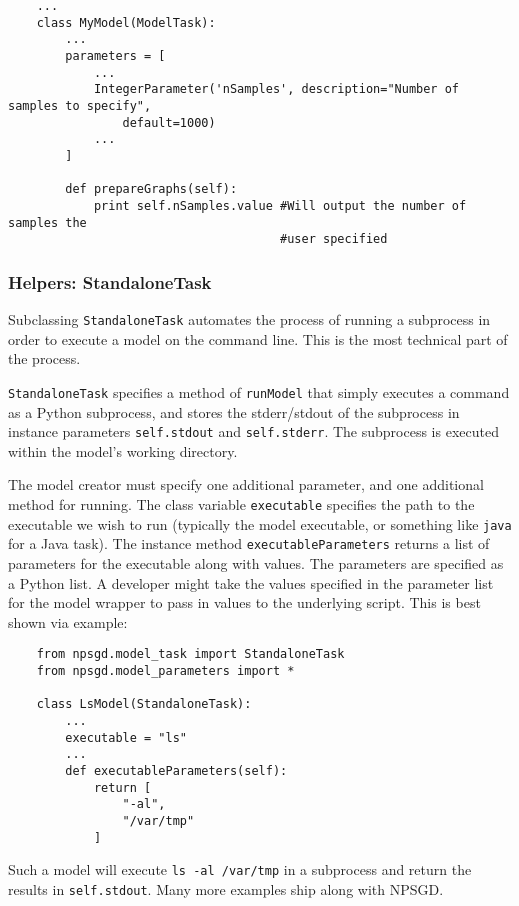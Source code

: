 \documentclass{article}
\newcommand{\mclass}[1]{\sloppy\texttt{#1}}
\begin{document}
\begin{lstlisting}
    ...
    class MyModel(ModelTask):
        ...
        parameters = [
            ...
            IntegerParameter('nSamples', description="Number of samples to specify",
                default=1000)
            ...
        ]

        def prepareGraphs(self):
            print self.nSamples.value #Will output the number of samples the
                                      #user specified

\end{lstlisting}

\subsubsection{Helpers: StandaloneTask}
Subclassing \mclass{StandaloneTask} automates the process of running a
subprocess in order to execute a model on the command line. This is the most
technical part of the process.

\mclass{StandaloneTask} specifies a method of \texttt{runModel} that simply
executes a command as a Python subprocess, and stores the stderr/stdout of the
subprocess in instance parameters \texttt{self.stdout} and \texttt{self.stderr}.
The subprocess is executed within the model's working directory. 

The model creator must specify one additional parameter, and one additional
method for running. The class variable \texttt{executable} specifies the path to
the executable we wish to run (typically the model executable, or something like
\texttt{java} for a Java task). The instance method \mclass{executableParameters} returns
a list of parameters for the executable along with values. The parameters are
specified as a Python list. A developer might take the values specified in the
parameter list for the model wrapper to pass in values to the underlying script. This is best shown via example:

\begin{lstlisting}
    from npsgd.model_task import StandaloneTask
    from npsgd.model_parameters import *

    class LsModel(StandaloneTask):
        ...
        executable = "ls"
        ...
        def executableParameters(self):
            return [
                "-al",
                "/var/tmp"
            ]
\end{lstlisting}

Such a model will execute \texttt{ls -al /var/tmp} in a subprocess and return the results in
\texttt{self.stdout}. Many more examples ship along with NPSGD.
\end{document}
